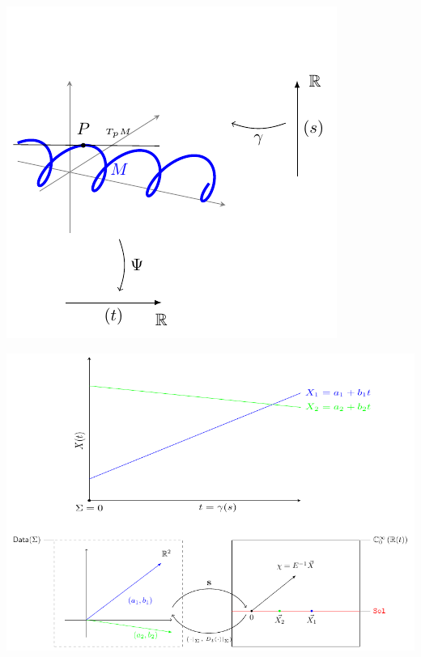 \documentclass[Main]{subfiles}
\begin{document}
	\includegraphics[width=\textwidth]{Pictures/Jacobi1D_GeometricPicture0}
				
	\includegraphics[width=\textwidth]{Pictures/Jacobi1D_GeometricPicturePanoramica}	
  				
\end{document}
